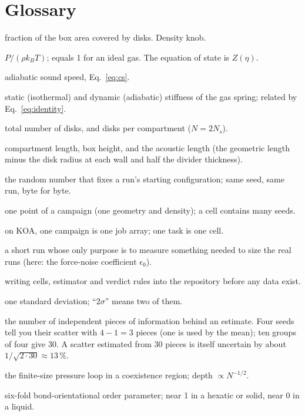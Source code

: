 \documentclass[11pt]{article}
\begin{document}
\section*{Glossary}
\begin{description}[style=nextline,nosep]
\item[$\eta$, packing fraction] fraction of the box area covered by disks. Density knob.
\item[$Z$, compressibility factor] $P/(\rho k_B T)$; equals 1 for an ideal gas. The equation of state is $Z(\eta)$.
\item[$c_s$] adiabatic sound speed, Eq.~\eqref{eq:cs}.
\item[$k_T$, $k_S$] static (isothermal) and dynamic (adiabatic) stiffness of the gas spring; related by Eq.~\eqref{eq:identity}.
\item[$N$, $N_s$] total number of disks, and disks per compartment ($N = 2N_s$).
\item[$L_0$, $H$, $L_{\mathrm{eff}}$] compartment length, box height, and the acoustic length (the geometric length minus the disk radius at each wall and half the divider thickness).
\item[seed] the random number that fixes a run's starting configuration; same seed, same run, byte for byte.
\item[cell] one point of a campaign (one geometry and density); a cell contains many seeds.
\item[array, task] on KOA, one campaign is one job array; one task is one cell.
\item[pilot] a short run whose only purpose is to measure something needed to size the real runs (here: the force-noise coefficient $\epsilon_0$).
\item[pre-registration] writing cells, estimator and verdict rules into the repository before any data exist.
\item[$\sigma$ (error)] one standard deviation; ``$2\sigma$'' means two of them.
\item[degrees of freedom] the number of independent pieces of information behind an estimate. Four seeds tell you their scatter with $4-1=3$ pieces (one is used by the mean); ten groups of four give 30. A scatter estimated from 30 pieces is itself uncertain by about $1/\sqrt{2\cdot 30} \approx 13\,\%$.
\item[Mayer--Wood loop] the finite-size pressure loop in a coexistence region; depth $\propto N^{-1/2}$.
\item[$\psi_6$] six-fold bond-orientational order parameter; near 1 in a hexatic or solid, near 0 in a liquid.
\end{description}
\end{document}

